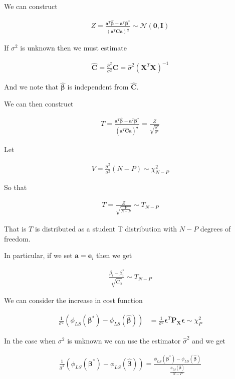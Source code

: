 \documentclass[12pt]{article}
\newcommand{\ep}{\epsilon}
\newcommand{\bv}[1]{\boldsymbol{#1}}
\begin{document}
We can construct

\begin{align}
Z = \frac{\bv{a}^T\bv{\hat{\beta}} - \bv{a}^T\bv{\beta^*}}{(\bv{a}^T\bv{C}\bv{a})^{\frac{1}{2}}} \sim \mathcal{N}(\bv{0}, \bv{I})
\end{align}

If $\sigma^2$ is unknown then we must estimate

\begin{align}
\bv{\hat{C}} = \frac{\hat{\sigma}^2}{\sigma^2}\bv{C} = \hat{\sigma}^2(\bv{X}^T\bv{X})^{-1}
\end{align}

And we note that $\bv{\hat{\beta}}$ is independent from $\bv{\hat{C}}$.

We can then construct

\begin{align}
T = \frac{\bv{a}^T\bv{\hat{\beta}} - \bv{a}^T\bv{\beta^*}}{(\bv{a}^T\bv{\hat{C}}\bv{a})^{\frac{1}{2}}} = \frac{Z}{\sqrt{\frac{\hat{\sigma}^2}{\sigma^2}}}
\end{align}

Let

\begin{align}
V = \frac{\hat{\sigma}^2}{\sigma^2} (N-P) \sim \chi^2_{N-P}
\end{align}

So that

\begin{align}
T = \frac{Z}{\sqrt{\frac{V}{N-P}}} \sim T_{N-P}
\end{align}

That is $T$ is distributed as a student T distribution with $N-P$ degrees of freedom.

In particular, if we set $\bv{a} = \bv{e}_i$ then we get

\begin{align}
\frac{\beta_i - \beta^*_i}{\sqrt{\hat{C}_{ii}}} \sim T_{N-P}
\end{align}

We can consider the increase in cost function

\begin{align}
\frac{1}{\sigma^2}(\phi_{LS}(\bv{\beta^*})-\phi_{LS}(\bv{\hat{\beta}})) &= \frac{1}{\sigma^2}\bv{\ep}^T\bv{P_X}\bv{\ep} \sim \chi^2_P
\end{align}

In the case when $\sigma^2$ is unknown we can use the estimator $\hat{\sigma}^2$ and we get

\begin{align}
\frac{1}{\hat{\sigma}^2}(\phi_{LS}(\bv{\beta^*})-\phi_{LS}(\bv{\hat{\beta}})) = \frac{\phi_{LS}(\bv{\beta^*})-\phi_{LS}(\bv{\hat{\beta}})}{\frac{\phi_{LS}(\bv{\hat{\beta}})}{N-P}}
\end{align}
\end{document}
